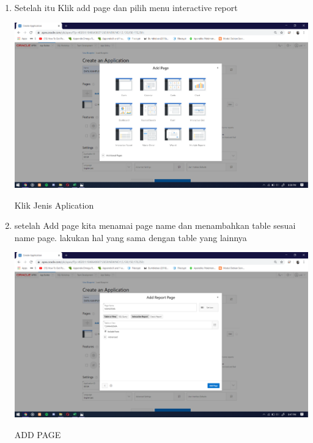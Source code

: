 \documentclass{article}
\begin{document}
\begin{enumerate}
    \item Setelah itu Klik add page dan pilih menu interactive report
    \begin{center}
         \centering
            \includegraphics[scale=0.27]{figures/DB10.png}
        \caption{Klik Jenis Aplication}
        \label{excel}
    \end{center}
    
      \item setelah Add page kita menamai page name dan menambahkan table sesuai name page. lakukan hal yang sama dengan table yang lainnya
    \begin{center}
         \centering
            \includegraphics[scale=0.27]{figures/DB11.png}
        \caption{ADD PAGE}
        \label{excel}
    \end{center}
    

\end{enumerate}
\end{document}
